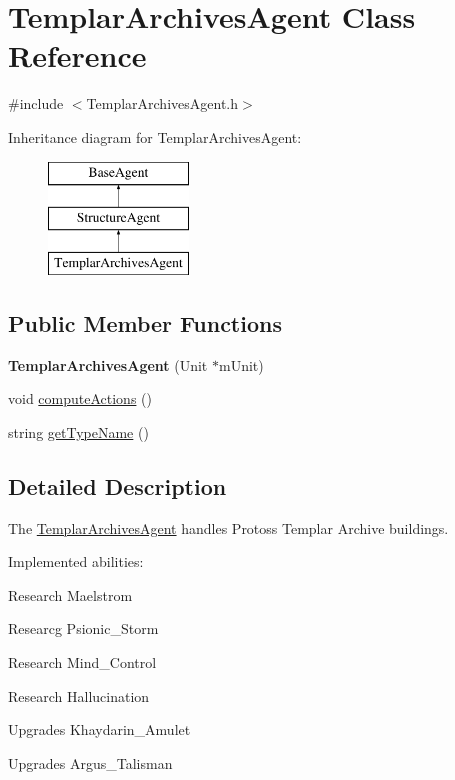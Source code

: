 \hypertarget{class_templar_archives_agent}{
\section{TemplarArchivesAgent Class Reference}
\label{class_templar_archives_agent}
}


{\ttfamily \#include $<$TemplarArchivesAgent.h$>$}

Inheritance diagram for TemplarArchivesAgent:\begin{figure}[H]
\begin{center}
\leavevmode
\includegraphics[height=3.000000cm]{class_templar_archives_agent}
\end{center}
\end{figure}
\subsection*{Public Member Functions}
\begin{DoxyCompactItemize}
\item 
\hypertarget{class_templar_archives_agent_a592ea0714374bbed120027d111bee007}{
{\bfseries TemplarArchivesAgent} (Unit $\ast$mUnit)}
\label{class_templar_archives_agent_a592ea0714374bbed120027d111bee007}

\item 
void \hyperlink{class_templar_archives_agent_adf24a5e890028c9706bea39f7130090d}{computeActions} ()
\item 
string \hyperlink{class_templar_archives_agent_a08f8a0e2014192145bb95a16c96165da}{getTypeName} ()
\end{DoxyCompactItemize}


\subsection{Detailed Description}
The \hyperlink{class_templar_archives_agent}{TemplarArchivesAgent} handles Protoss Templar Archive buildings.

Implemented abilities:
\begin{DoxyItemize}
\item Research Maelstrom
\item Researcg Psionic\_\-Storm
\item Research Mind\_\-Control
\item Research Hallucination
\item Upgrades Khaydarin\_\-Amulet
\item Upgrades Argus\_\-Talisman
\end{DoxyItemize}

